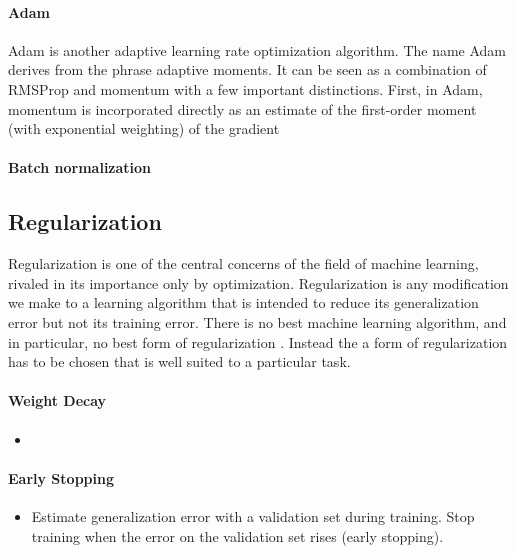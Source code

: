 \documentclass{scrartcl}
\begin{document}
\paragraph{Adam}

Adam \cite{Kingma2014} is another adaptive learning rate optimization algorithm. The name Adam derives from the phrase adaptive moments. It can be seen as a combination of RMSProp and momentum with a few important distinctions. First, in Adam, momentum is incorporated directly as an estimate of the first-order moment (with exponential weighting) of the gradient  

\paragraph{Batch normalization}





\subsection{Regularization}

Regularization is one of the central concerns of the field of machine learning, rivaled in its importance only by optimization. Regularization is any modification we make to a learning algorithm that is intended to reduce its generalization error but not its training error. There is no best machine learning algorithm, and in particular, no best form of regularization \cite{Wolpert1996}. Instead the a form of regularization has to be chosen that is well suited to a particular task.



\paragraph{Weight Decay}
\begin{itemize}
\item 
\end{itemize}


\paragraph{Early Stopping} 
\begin{itemize}
\item Estimate generalization error with a validation set during training. Stop training when the error on the validation set rises (early stopping).
\end{itemize}
\end{document}
